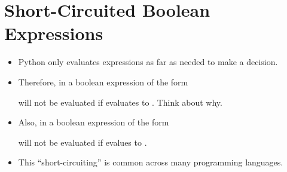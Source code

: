 \documentclass[letterpaper,10pt,english]{sphinxmanual}
\begin{document}
\section{Short-Circuited Boolean Expressions}
\label{\detokenize{lecture_notes/lec11_conditionals2:short-circuited-boolean-expressions}}\begin{itemize}
\item {} 
Python only evaluates expressions as far as needed to make a
decision.

\item {} 
Therefore, in a boolean expression of the form

%
\begin{sphinxVerbatim}[commandchars=\\\{\}]
  
\end{sphinxVerbatim}

 will not be evaluated if  evaluates to .
Think about why.

\item {} 
Also, in a boolean expression of the form

%
\begin{sphinxVerbatim}[commandchars=\\\{\}]
  
\end{sphinxVerbatim}

 will not be evaluated if  evalues to .

\item {} 
This “short-circuiting” is common across many programming languages.

\end{itemize}
\end{document}
